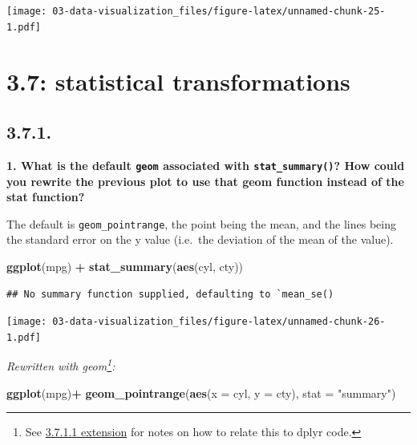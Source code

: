 \documentclass[]{book}
\newenvironment{Shaded}{\begin{snugshade}}{\end{snugshade}}
\newcommand{\DataTypeTok}[1]{\textcolor[rgb]{0.13,0.29,0.53}{#1}}
\newcommand{\KeywordTok}[1]{\textcolor[rgb]{0.13,0.29,0.53}{\textbf{#1}}}
\newcommand{\NormalTok}[1]{#1}
\newcommand{\OperatorTok}[1]{\textcolor[rgb]{0.81,0.36,0.00}{\textbf{#1}}}
\newcommand{\StringTok}[1]{\textcolor[rgb]{0.31,0.60,0.02}{#1}}
\let\rmarkdownfootnote\footnote%
\def\footnote{\protect\rmarkdownfootnote}
\theoremstyle{definition}
\theoremstyle{definition}
\theoremstyle{definition}
\theoremstyle{remark}
\begin{document}
\texttt{[image: 03-data-visualization\_files/figure-latex/unnamed-chunk-25-1.pdf]}

\hypertarget{statistical-transformations}{%
\section{3.7: statistical
transformations}\label{statistical-transformations}}

\hypertarget{section-4}{%
\subsection{3.7.1.}\label{section-4}}

\textbf{1. What is the default \texttt{geom} associated with
\texttt{stat\_summary()}? How could you rewrite the previous plot to use
that geom function instead of the stat function?}

The default is \texttt{geom\_pointrange}, the point being the mean, and
the lines being the standard error on the y value (i.e.~the deviation of
the mean of the value).

\begin{Shaded}
\begin{Highlighting}[]
\KeywordTok{ggplot}\NormalTok{(mpg) }\OperatorTok{+}
\StringTok{  }\KeywordTok{stat_summary}\NormalTok{(}\KeywordTok{aes}\NormalTok{(cyl, cty))}
\end{Highlighting}
\end{Shaded}

\begin{verbatim}
## No summary function supplied, defaulting to `mean_se()
\end{verbatim}

\texttt{[image: 03-data-visualization\_files/figure-latex/unnamed-chunk-26-1.pdf]}

\emph{Rewritten with geom\footnote{See
  \protect\hyperlink{extension}{3.7.1.1 extension} for notes on how to
  relate this to dplyr code.}:}

\begin{Shaded}
\begin{Highlighting}[]
\KeywordTok{ggplot}\NormalTok{(mpg)}\OperatorTok{+}
\StringTok{  }\KeywordTok{geom_pointrange}\NormalTok{(}\KeywordTok{aes}\NormalTok{(}\DataTypeTok{x =}\NormalTok{ cyl, }\DataTypeTok{y =}\NormalTok{ cty), }\DataTypeTok{stat =} \StringTok{"summary"}\NormalTok{)}
\end{Highlighting}
\end{Shaded}
\end{document}
